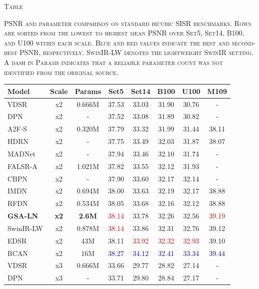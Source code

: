 \documentclass[conference]{IEEEtran}
\newcommand{\rankfirst}[1]{\textcolor{blue}{#1}}
\newcommand{\ranksecond}[1]{\textcolor{red}{#1}}
\begin{document}
\begin{@twocolumnfalse}
\label{tab:psnr}
{\footnotesize \textsc{Table }\\}
{\footnotesize \textsc{PSNR and parameter comparison on standard bicubic SISR benchmarks. Rows are sorted from the lowest to highest mean PSNR over Set5, Set14, B100, and U100 within each scale. Blue and red values indicate the best and second-best PSNR, respectively. SwinIR-LW denotes the lightweight SwinIR setting. A dash in Params indicates that a reliable parameter count was not identified from the original source.}\par}
\vspace{0.35\baselineskip}
\tiny
\setlength{\tabcolsep}{2.6pt}
\renewcommand{\arraystretch}{0.74}
\begin{tabular*}{\textwidth}{@{\extracolsep{\fill}}lccccccc}
\toprule
Model & Scale & Params & Set5 & Set14 & B100 & U100 & M109 \\
\midrule
VDSR & x2 & 0.666M & 37.53 & 33.03 & 31.90 & 30.76 & - \\
DPN & x2 & - & 37.52 & 33.08 & 31.89 & 30.82 & - \\
A2F-S & x2 & 0.320M & 37.79 & 33.32 & 31.99 & 31.44 & 38.11 \\
HDRN & x2 & - & 37.75 & 33.49 & 32.03 & 31.87 & 38.07 \\
MADNet & x2 & - & 37.94 & 33.46 & 32.10 & 31.74 & - \\
FALSR-A & x2 & 1.021M & 37.82 & 33.55 & 32.12 & 31.93 & - \\
CBPN & x2 & - & 37.90 & 33.60 & 32.17 & 32.14 & - \\
IMDN & x2 & 0.694M & 38.00 & 33.63 & 32.19 & 32.17 & 38.88 \\
RFDN & x2 & 0.534M & 38.05 & 33.68 & 32.16 & 32.12 & 38.88 \\
\textbf{GSA-LN} & \textbf{x2} & \textbf{2.6M} & \ranksecond{38.14} & 33.78 & 32.26 & 32.56 & \ranksecond{39.19} \\
SwinIR-LW & x2 & 0.878M & \ranksecond{38.14} & 33.86 & 32.31 & 32.76 & 39.12 \\
EDSR & x2 & 43M & 38.11 & \ranksecond{33.92} & \ranksecond{32.32} & \ranksecond{32.93} & 39.10 \\
RCAN & x2 & 16M & \rankfirst{38.27} & \rankfirst{34.12} & \rankfirst{32.41} & \rankfirst{33.34} & \rankfirst{39.44} \\
\midrule
VDSR & x3 & 0.666M & 33.66 & 29.77 & 28.82 & 27.14 & - \\
DPN & x3 & - & 33.71 & 29.80 & 28.84 & 27.17 & - \\

\end{tabular*}
\end{@twocolumnfalse}
\end{document}
